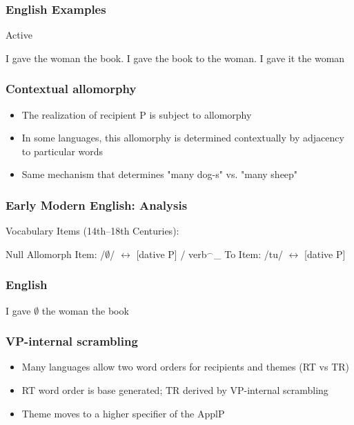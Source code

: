 \documentclass{beamer}
\begin{document}
\begin{frame}
	\frametitle{English Examples}
\begin{exe}
	\ex Active
	\begin{xlist}
		\ex I gave the woman the book.
		\ex I gave the book to the woman.
		\ex I gave it the woman
	\end{xlist}
\end{exe}
\end{frame}

\begin{frame}
	\frametitle{Contextual allomorphy}
	\begin{itemize}
		\item The realization of recipient P is subject to allomorphy
		\item In some languages, this allomorphy is determined contextually by adjacency to particular words
		\item Same mechanism that determines "many dog-s" vs. "many sheep"
	\end{itemize}
\end{frame}

\begin{frame}
	\frametitle{Early Modern English: Analysis}
	\begin{exe}
		\ex Vocabulary Items (14th--18th Centuries):
		\begin{xlist}
			\ex Null Allomorph Item: /$\emptyset$/ $\leftrightarrow$ [dative P] / verb$^{\smallfrown}$\_
			\ex To Item: /tu/ $\leftrightarrow$ [dative P]
		\end{xlist}
	\end{exe}
\end{frame}


\begin{frame}
	\frametitle{English}
	\vfill
	I gave $\emptyset$ the woman the book
	\vfill
\end{frame}

\begin{frame}
	\frametitle{VP-internal scrambling}
	\begin{itemize}
		\item Many languages allow two word orders for recipients and themes (RT vs TR)
		\item RT word order is base generated; TR derived by VP-internal scrambling \citep{Takano.1998,Lenerz.1977}
		\item Theme moves to a higher specifier of the ApplP \citep{McGinnis.1998}
	\end{itemize}
\end{frame}
\end{document}

